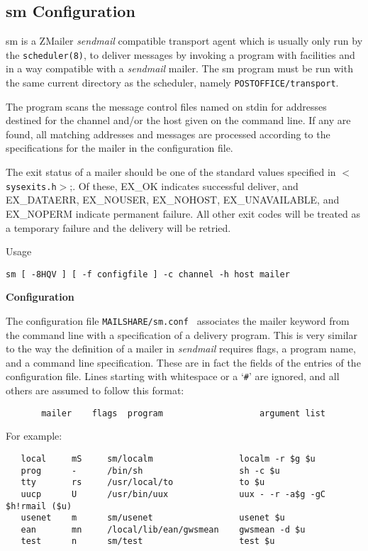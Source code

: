 \subsection{sm Configuration}



sm  is a ZMailer {\em sendmail\/} compatible transport agent which is usually only run
by the {\tt scheduler(8)}, to deliver messages  by  invoking a
program with  facilities  and  in a way compatible with a
{\em sendmail\/} mailer. The sm program must be run with the same
current directory as the scheduler, namely {\tt POSTOFFICE/transport}.

The program scans the message control files named on stdin
for addresses destined for the channel and/or the host
given on the command line. If any are found, all matching
addresses and messages are processed according to the
specifications for the mailer in the configuration file.

The exit status of a mailer should be one of the standard
values specified in {\tt {\(<\)}sysexits.h{\(>\)}};. Of these, 
EX\_OK indicates  successful  deliver,  and  EX\_DATAERR,   EX\_NOUSER,
EX\_NOHOST,  EX\_UNAVAILABLE,  and EX\_NOPERM indicate permanent failure.  
All other exit codes will be treated  as a
temporary failure and the delivery will be retried.

Usage 

{\tt sm [ -8HQV ] [ -f configfile ] -c channel -h host mailer}


{\bf Configuration}

The configuration file {\tt MAILSHARE/sm.conf } associates the 
mailer keyword  from
the command line with a specification of a delivery program.  
This is very similar to the way the definition of a
mailer in  {\em sendmail\/} requires flags, a program name, and a
command line specification.  These are in fact the  fields
of  the entries of the configuration file.  Lines starting
with whitespace or a `{\tt \#}' are ignored, and all  
others are assumed to follow this format:

\begin{verbatim}
       mailer    flags  program                   argument list
\end{verbatim}


For example:

\begin{verbatim}
   local     mS     sm/localm                 localm -r $g $u
   prog      -      /bin/sh                   sh -c $u
   tty       rs     /usr/local/to             to $u
   uucp      U      /usr/bin/uux              uux - -r -a$g -gC $h!rmail ($u)
   usenet    m      sm/usenet                 usenet $u
   ean       mn     /local/lib/ean/gwsmean    gwsmean -d $u
   test      n      sm/test                   test $u
\end{verbatim}


